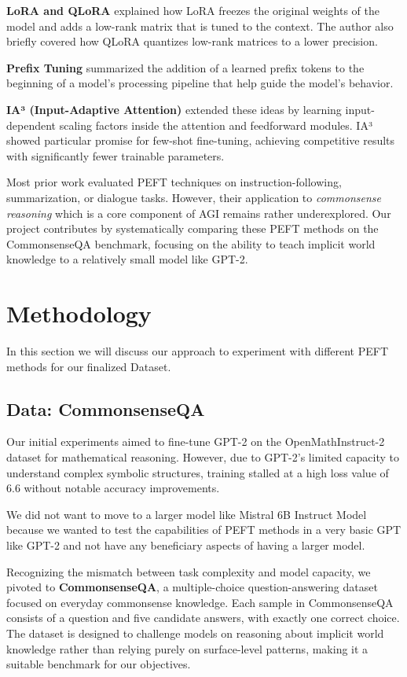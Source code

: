 \documentclass[11pt,twocolumn]{article}
\begin{document}
\textbf{LoRA and QLoRA} \cite{Noble2023} explained how LoRA freezes the original weights of the model and adds a low-rank matrix that is tuned to the context. The author also briefly covered how QLoRA quantizes low-rank matrices to a lower precision.  

\textbf{Prefix Tuning} \cite{Razavi2023} summarized the addition of a learned prefix tokens to the beginning of a model's processing pipeline that help guide the model's behavior.

\textbf{IA³ (Input-Adaptive Attention)} \cite{Liu2022} extended these ideas by learning input-dependent scaling factors inside the attention and feedforward modules. IA³ showed particular promise for few-shot fine-tuning, achieving competitive results with significantly fewer trainable parameters.

Most prior work evaluated PEFT techniques on instruction-following, summarization, or dialogue tasks. However, their application to \textit{commonsense reasoning} which is a core component of AGI remains rather underexplored. Our project contributes by systematically comparing these PEFT methods on the CommonsenseQA benchmark, focusing on the ability to teach implicit world knowledge to a relatively small model like GPT-2.



\section{Methodology}
\label{sec:methodology}
In this section we will discuss our approach to experiment with different PEFT methods for our finalized Dataset.

\subsection{Data: CommonsenseQA}
Our initial experiments aimed to fine-tune GPT-2 on the OpenMathInstruct-2 dataset for mathematical reasoning. However, due to GPT-2's limited capacity to understand complex symbolic structures, training stalled at a high loss value of 6.6 without notable accuracy improvements.

We did not want to move to a larger model like Mistral 6B Instruct Model because we wanted to test the capabilities of PEFT methods in a very basic GPT like GPT-2 and not have any beneficiary aspects of having a larger model.

Recognizing the mismatch between task complexity and model capacity, we pivoted to \textbf{CommonsenseQA}, a multiple-choice question-answering dataset focused on everyday commonsense knowledge. Each sample in CommonsenseQA consists of a question and five candidate answers, with exactly one correct choice. The dataset is designed to challenge models on reasoning about implicit world knowledge rather than relying purely on surface-level patterns, making it a suitable benchmark for our objectives.
\end{document}
